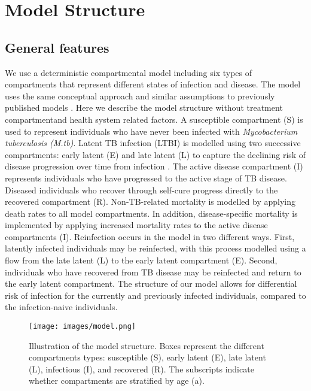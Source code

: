 
\section{Model Structure}

\subsection{General features}

We use a deterministic compartmental model including six types of compartments that represent 
different states of infection and disease. The model uses the same conceptual approach and similar 
assumptions to previously published models \cite{trauer-2017, ragonnet-2019, ragonnet-2021, ragonnet-2022}. 
Here we describe the model structure without treatment compartmentand health system related factors. 
\newline
A susceptible compartment (S) is used to represent individuals who have 
never been infected with \emph{Mycobacterium tuberculosis (M.tb)}. Latent TB infection (LTBI) is modelled 
using two successive compartments: early latent (E) and late latent (L) to capture the declining risk of 
disease progression over time from infection \cite{ragonnet-2017}. The active disease compartment (I) represents 
individuals who have progressed to the active stage of TB disease. Diseased individuals who recover 
through self-cure progress directly to the recovered compartment (R).
\newline
Non-TB-related mortality is modelled by applying death rates to all model compartments. In addition, 
disease-specific mortality is implemented by applying increased mortality rates to the active disease 
compartments (I).
\newline
Reinfection occurs in the model in two different ways. First, latently infected individuals may be 
reinfected, with this process modelled using a flow from the late latent (L) to the early latent 
compartment (E). Second, individuals who have recovered from TB disease may be reinfected and 
return to the early latent compartment. The structure of our model allows for differential risk of 
infection for the currently and previously infected individuals, compared to the infection-naive 
individuals.
\begin{figure}[!htbp]
    \texttt{[image: images/model.png]}
    \caption{Illustration of the model structure. 
    Boxes represent the different compartments types: susceptible (S), early latent (E), late latent (L), infectious (I), and recovered (R).
    The subscripts indicate whether compartments are stratified by age (a).}
    \label{fig:model}
\end{figure}

